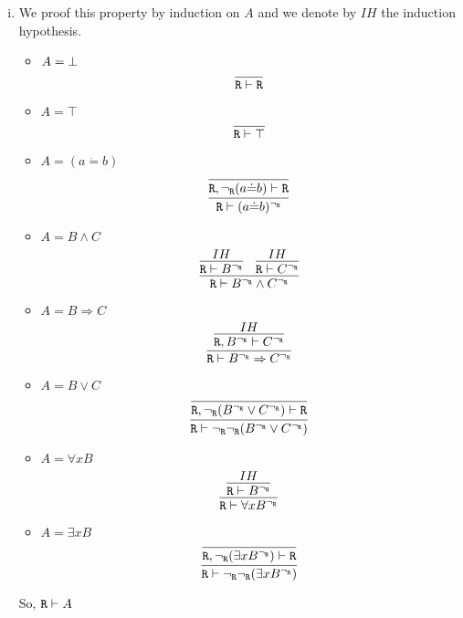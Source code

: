 \begin{enumerate}[(i)]
    \item We proof this property by induction on $A$ and we denote by $IH$ the induction hypothesis.
    \begin{itemize}
        \item $A=\bot$
            $$
                \infer{
                    \R \vdash \R
                }{
                }
            $$
        \item $A=\top$
            $$
                \infer{
                    \R \vdash \top
                }{
                }
            $$
        \item $A=(a\dot{=}b)$
            $$
                \infer{
                    \R \vdash (a\dot{=}b)^\ngr
                }{
                    \infer{
                        \R, \ngr(a\dot{=}b) \vdash \R
                    }{
                    }
                }
            $$
        \item $A=B\wedge C$
            $$
                \infer{
                    \R \vdash B^\ngr \wedge C^\ngr
                }{
                    \infer{
                        \R \vdash B^\ngr
                    }{
                        IH
                    }&
                    \infer{
                        \R \vdash C^\ngr
                    }{
                        IH
                    }
                }
            $$
        \item $A=B \Rightarrow C$
            $$
                \infer{
                    \R \vdash B^\ngr \Rightarrow C^\ngr
                }{
                    \infer{
                        \R, B^\ngr \vdash C^\ngr
                    }{
                        IH
                    }
                }
            $$
        \item $A=B \vee C$
            $$
                \infer{
                    \R \vdash \ngr\ngr(B^\ngr \vee C^\ngr)
                }{
                    \infer{
                        \R, \ngr(B^\ngr \vee C^\ngr) \vdash \R
                    }{
                    }
                }
            $$
        \item $A=\forall x B$
            $$
                \infer{
                    \R \vdash \forall x B^\ngr
                }{
                    \infer{
                        \R \vdash B^\ngr
                    }{
                        IH
                    }
                }
            $$
        \item $A=\exists x B$
            $$
                \infer{
                    \R \vdash \ngr\ngr(\exists x B^\ngr)
                }{
                    \infer{
                        \R, \ngr(\exists x B^\ngr) \vdash \R
                    }{
                    }
                }
            $$
    \end{itemize}
    So, $\texttt{R}\vdash A$
    

\end{enumerate}
